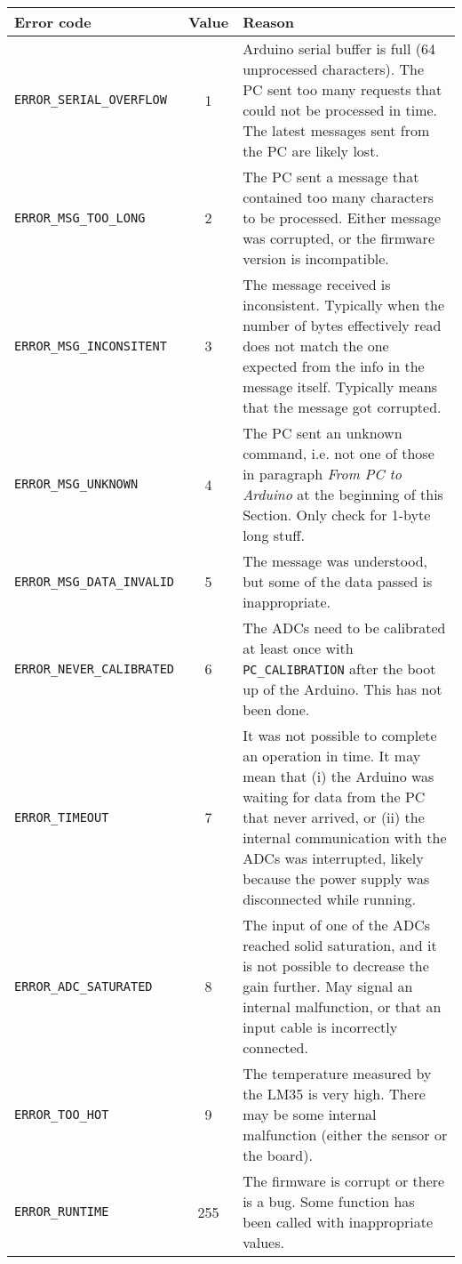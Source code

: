 \documentclass[11pt,a4paper,english]{article}
\begin{document}
\begin{itemize}
	\begin{centering}
	\begin{tabular}{lcp{}}\toprule
	Error code                          & Value & Reason\\\midrule
	\texttt{ERROR\_SERIAL\_OVERFLOW}    & 1     & Arduino serial buffer is full (64 unprocessed characters). The PC sent too many requests that could not be processed in time. The latest messages sent from the PC are likely lost.\\
	\texttt{ERROR\_MSG\_TOO\_LONG}      & 2     & The PC sent a message that contained too many characters to be processed. Either message was corrupted, or the firmware version is incompatible.\\
	\texttt{ERROR\_MSG\_INCONSITENT}    & 3     & The message received is inconsistent. Typically when the number of bytes effectively read does not match the one expected from the info in the message itself. Typically means that the message got corrupted.\\
	\texttt{ERROR\_MSG\_UNKNOWN}        & 4     & The PC sent an unknown command, i.e. not one of those in paragraph \textit{From PC to Arduino} at the beginning of this Section. Only check for 1-byte long stuff.\\
	\texttt{ERROR\_MSG\_DATA\_INVALID}  & 5     & The message was understood, but some of the data passed is inappropriate.\\
	\texttt{ERROR\_NEVER\_CALIBRATED}   & 6     & The ADCs need to be calibrated at least once with \texttt{PC\_CALIBRATION} after the boot up of the Arduino. This has not been done.\\
	\texttt{ERROR\_TIMEOUT}             & 7     & It was not possible to complete an operation in time. It may mean that (i) the Arduino was waiting for data from the PC that never arrived, or (ii) the internal communication with the ADCs was interrupted, likely because the power supply was disconnected while running.\\
	\texttt{ERROR\_ADC\_SATURATED}      & 8     & The input of one of the ADCs reached solid saturation, and it is not possible to decrease the gain further. May signal an internal malfunction, or that an input cable is incorrectly connected.\\
	\texttt{ERROR\_TOO\_HOT}            & 9     & The temperature measured by the LM35 is very high. There may be some internal malfunction (either the sensor or the board).\\
	\texttt{ERROR\_RUNTIME}				& 255   & The firmware is corrupt or there is a bug. Some function has been called with inappropriate values.\\
	\bottomrule
	\end{tabular}
	\end{centering}
\end{itemize}
\end{document}
